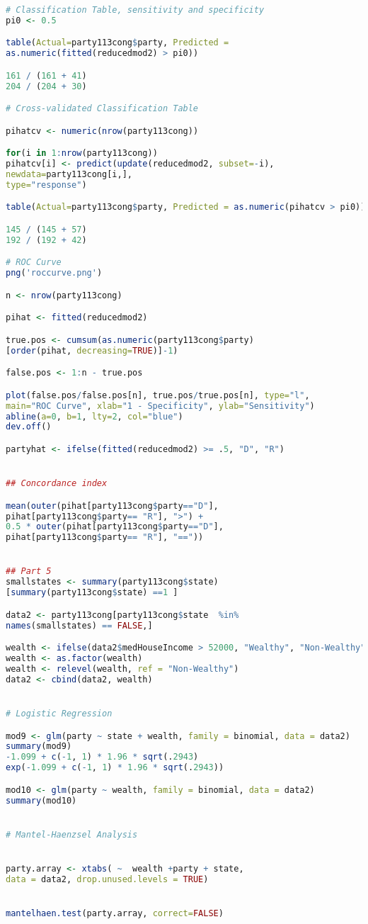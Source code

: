 \documentclass[12pt,a4paper]{article}
\begin{document}
\begin{lstlisting}[language=R]
# Classification Table, sensitivity and specificity
pi0 <- 0.5

table(Actual=party113cong$party, Predicted = 
as.numeric(fitted(reducedmod2) > pi0))

161 / (161 + 41)
204 / (204 + 30)

# Cross-validated Classification Table

pihatcv <- numeric(nrow(party113cong))

for(i in 1:nrow(party113cong))
pihatcv[i] <- predict(update(reducedmod2, subset=-i), 
newdata=party113cong[i,],
type="response")

table(Actual=party113cong$party, Predicted = as.numeric(pihatcv > pi0))

145 / (145 + 57)
192 / (192 + 42)

# ROC Curve
png('roccurve.png')

n <- nrow(party113cong)

pihat <- fitted(reducedmod2)

true.pos <- cumsum(as.numeric(party113cong$party)
[order(pihat, decreasing=TRUE)]-1)

false.pos <- 1:n - true.pos

plot(false.pos/false.pos[n], true.pos/true.pos[n], type="l",
main="ROC Curve", xlab="1 - Specificity", ylab="Sensitivity")
abline(a=0, b=1, lty=2, col="blue")
dev.off()

partyhat <- ifelse(fitted(reducedmod2) >= .5, "D", "R")


## Concordance index

mean(outer(pihat[party113cong$party=="D"], 
pihat[party113cong$party== "R"], ">") +
0.5 * outer(pihat[party113cong$party=="D"], 
pihat[party113cong$party== "R"], "=="))


## Part 5
smallstates <- summary(party113cong$state)
[summary(party113cong$state) ==1 ]

data2 <- party113cong[party113cong$state  %in% 
names(smallstates) == FALSE,]

wealth <- ifelse(data2$medHouseIncome > 52000, "Wealthy", "Non-Wealthy" )
wealth <- as.factor(wealth)
wealth <- relevel(wealth, ref = "Non-Wealthy")
data2 <- cbind(data2, wealth)


# Logistic Regression

mod9 <- glm(party ~ state + wealth, family = binomial, data = data2)
summary(mod9)
-1.099 + c(-1, 1) * 1.96 * sqrt(.2943)
exp(-1.099 + c(-1, 1) * 1.96 * sqrt(.2943))

mod10 <- glm(party ~ wealth, family = binomial, data = data2)
summary(mod10)


# Mantel-Haenzsel Analysis


party.array <- xtabs( ~  wealth +party + state, 
data = data2, drop.unused.levels = TRUE)


mantelhaen.test(party.array, correct=FALSE)


\end{lstlisting}
\end{document}
